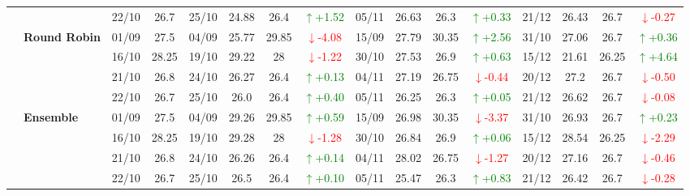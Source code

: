 {\begin{longtable}{llcc|cccc|cccc|cccc}
&
& 22/10 & 26.7 & 25/10 & 24.88 & 26.4 & \textcolor{green}{\(\uparrow\)+1.52} & 05/11 & 26.63 & 26.3 & \textcolor{green}{\(\uparrow\)+0.33} & 21/12 & 26.43 & 26.7 & \textcolor{red}{\(\downarrow\)-0.27} \\
\cmidrule(lr){2-16}


& \textbf{Round Robin}
& 01/09 & 27.5 & 04/09 & 25.77 & 29.85 & \textcolor{red}{\(\downarrow\)-4.08} & 15/09 & 27.79 & 30.35 & \textcolor{green}{\(\uparrow\)+2.56} & 31/10 & 27.06 & 26.7 & \textcolor{green}{\(\uparrow\)+0.36} \\

& 
& 16/10 & 28.25 & 19/10 & 29.22 & 28 & \textcolor{red}{\(\downarrow\)-1.22} & 30/10 & 27.53 & 26.9 & \textcolor{green}{\(\uparrow\)+0.63} & 15/12 & 21.61 & 26.25 & \textcolor{green}{\(\uparrow\)+4.64} \\

& 
& 21/10 & 26.8 & 24/10 & 26.27 & 26.4 & \textcolor{green}{\(\uparrow\)+0.13} & 04/11 & 27.19 & 26.75 & \textcolor{red}{\(\downarrow\)-0.44} & 20/12 & 27.2 & 26.7 & \textcolor{red}{\(\downarrow\)-0.50} \\

&
& 22/10 & 26.7 & 25/10 & 26.0 & 26.4 & \textcolor{green}{\(\uparrow\)+0.40} & 05/11 & 26.25 & 26.3 & \textcolor{green}{\(\uparrow\)+0.05} & 21/12 & 26.62 & 26.7 & \textcolor{red}{\(\downarrow\)-0.08} \\
\cmidrule(lr){2-16}


& \textbf{Ensemble}
& 01/09 & 27.5 & 04/09 & 29.26 & 29.85& \textcolor{green}{\(\uparrow\)+0.59} & 15/09 & 26.98 & 30.35 & \textcolor{red}{\(\downarrow\)-3.37} & 31/10 & 26.93 & 26.7 & \textcolor{green}{\(\uparrow\)+0.23} \\

& 
& 16/10 & 28.25 & 19/10 & 29.28 & 28 & \textcolor{red}{\(\downarrow\)-1.28} & 30/10 & 26.84 & 26.9 & \textcolor{green}{\(\uparrow\)+0.06} & 15/12 & 28.54 & 26.25 & \textcolor{red}{\(\downarrow\)-2.29} \\

& 
& 21/10 & 26.8 & 24/10 & 26.26 & 26.4 & \textcolor{green}{\(\uparrow\)+0.14} & 04/11 & 28.02 & 26.75 & \textcolor{red}{\(\downarrow\)-1.27} & 20/12 & 27.16 & 26.7 & \textcolor{red}{\(\downarrow\)-0.46} \\

&
& 22/10 & 26.7 & 25/10 & 26.5 & 26.4 & \textcolor{green}{\(\uparrow\)+0.10} & 05/11 & 25.47 & 26.3 & \textcolor{green}{\(\uparrow\)+0.83} & 21/12 & 26.42 & 26.7 & \textcolor{red}{\(\downarrow\)-0.28} \\
\midrule




\end{longtable}}
